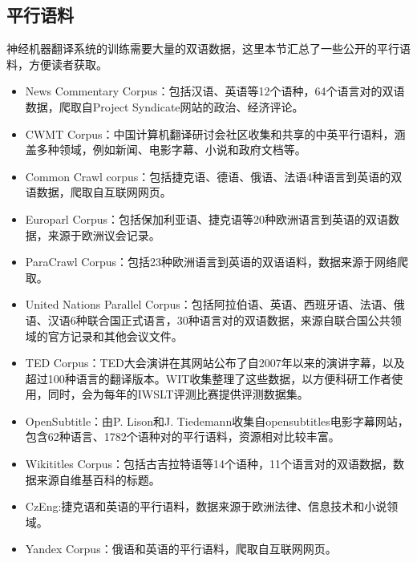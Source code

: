 \begin{appendices}
\section{平行语料}
\parinterval 神经机器翻译系统的训练需要大量的双语数据，这里本节汇总了一些公开的平行语料，方便读者获取。
\vspace{0.5em}
\begin{itemize}
\item News Commentary Corpus：包括汉语、英语等12个语种，64个语言对的双语数据，爬取自Project Syndicate网站的政治、经济评论。
\vspace{0.5em}
\item CWMT Corpus：中国计算机翻译研讨会社区收集和共享的中英平行语料，涵盖多种领域，例如新闻、电影字幕、小说和政府文档等。
\vspace{0.5em}
\item Common Crawl corpus：包括捷克语、德语、俄语、法语4种语言到英语的双语数据，爬取自互联网网页。
\vspace{0.5em}
\item Europarl Corpus：包括保加利亚语、捷克语等20种欧洲语言到英语的双语数据，来源于欧洲议会记录。
\vspace{0.5em}
\item ParaCrawl Corpus：包括23种欧洲语言到英语的双语语料，数据来源于网络爬取。
\vspace{0.5em}
\item United Nations Parallel Corpus：包括阿拉伯语、英语、西班牙语、法语、俄语、汉语6种联合国正式语言，30种语言对的双语数据，来源自联合国公共领域的官方记录和其他会议文件。
\vspace{0.5em}
\item TED Corpus：TED大会演讲在其网站公布了自2007年以来的演讲字幕，以及超过100种语言的翻译版本。WIT收集整理了这些数据，以方便科研工作者使用，同时，会为每年的IWSLT评测比赛提供评测数据集。
\vspace{0.5em}
\item OpenSubtitle：由P. Lison和J. Tiedemann收集自opensubtitles电影字幕网站，包含62种语言、1782个语种对的平行语料，资源相对比较丰富。
\vspace{0.5em}
\item Wikititles Corpus：包括古吉拉特语等14个语种，11个语言对的双语数据，数据来源自维基百科的标题。
\vspace{0.5em}
\item CzEng:捷克语和英语的平行语料，数据来源于欧洲法律、信息技术和小说领域。
\vspace{0.5em}
\item Yandex Corpus：俄语和英语的平行语料，爬取自互联网网页。

\end{itemize}
\end{appendices}
